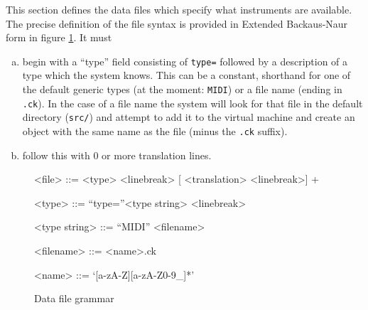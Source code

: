 \documentclass[12pt]{article}
\begin{document}
This section defines the data files which specify what instruments are available. The precise definition of the file syntax is provided in Extended 
Backaus-Naur form in figure \ref{ebnfspec}. 
It must 
\begin{enumerate} [a)]
\item{begin with a ``type'' field consisting of \texttt{type=} followed by a description of a type which the system knows. This can be
a constant, shorthand for one of the default generic types (at the moment: \texttt{MIDI}) or a file name (ending in \texttt{.ck}). In the case of a file name
the system will look for that file in the default directory (\texttt{src/}) and attempt to add it to the virtual machine and create an object with the same
name as the file (minus the \texttt{.ck} suffix).}
\item{follow this with 0 or more translation lines.}

\end{enumerate}

\begin{figure} [htp]
\setlength{\grammarindent}{12em}
\begin{grammar}
	<file> ::= <type> <linebreak> [ <translation> <linebreak>] + 
	
	<type> ::= ``type=''<type string> <linebreak>
	
	<type string> ::= ``MIDI'' \alt <filename>
	
	<filename> ::= <name>.ck
	
	<name> ::= `[a-zA-Z][a-zA-Z0-9_]*'

\end{grammar}


\caption[Grammar]{Data file grammar}
\label{ebnfspec}
\end{figure}
\end{document}
